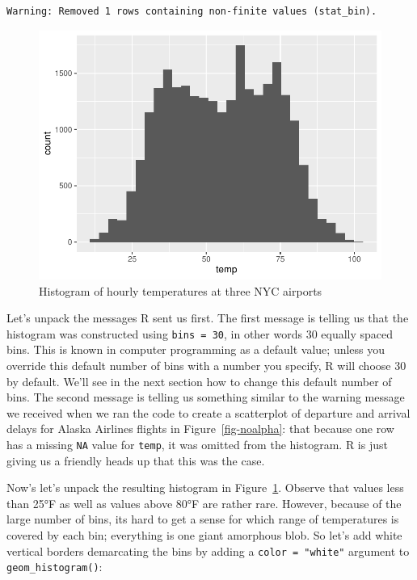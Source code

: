 \documentclass[
  letterpaper,
  DIV=11,
  numbers=noendperiod]{scrreprt}
\theoremstyle{definition}
\theoremstyle{remark}
\begin{document}
\begin{verbatim}
Warning: Removed 1 rows containing non-finite values (stat_bin).
\end{verbatim}

\begin{figure}[H]

{\centering \includegraphics{02-visualization_files/figure-pdf/fig-weather-histogram-1.pdf}

}

\caption{\label{fig-weather-histogram}Histogram of hourly temperatures
at three NYC airports}

\end{figure}

Let's unpack the messages R sent us first. The first message is telling
us that the histogram was constructed using \texttt{bins\ =\ 30}, in
other words 30 equally spaced bins. This is known in computer
programming as a default value; unless you override this default number
of bins with a number you specify, R will choose 30 by default. We'll
see in the next section how to change this default number of bins. The
second message is telling us something similar to the warning message we
received when we ran the code to create a scatterplot of departure and
arrival delays for Alaska Airlines flights in Figure~\ref{fig-noalpha}:
that because one row has a missing \texttt{NA} value for \texttt{temp},
it was omitted from the histogram. R is just giving us a friendly heads
up that this was the case.

Now's let's unpack the resulting histogram in
Figure~\ref{fig-weather-histogram}. Observe that values less than 25°F
as well as values above 80°F are rather rare. However, because of the
large number of bins, its hard to get a sense for which range of
temperatures is covered by each bin; everything is one giant amorphous
blob. So let's add white vertical borders demarcating the bins by adding
a \texttt{color\ =\ "white"} argument to \texttt{geom\_histogram()}:
\end{document}
